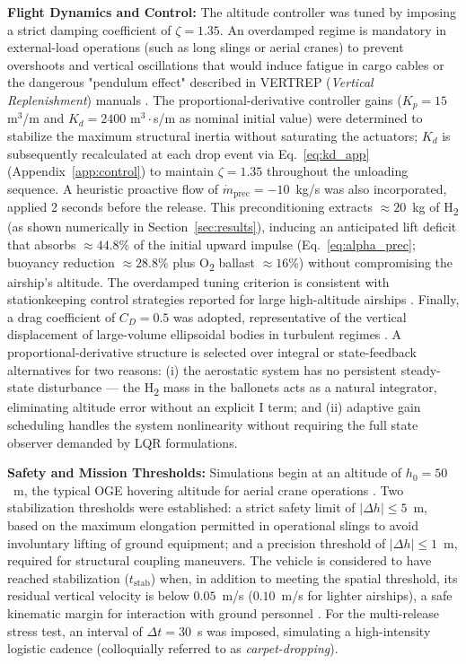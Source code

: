 \documentclass[applsci,article,submit,pdftex,moreauthors]{Definitions/mdpi}
\newcommand{\added}[1]{#1}
\begin{document}
\textbf{Flight Dynamics and Control:} The altitude controller was tuned by imposing a strict damping coefficient of $\zeta = 1.35$. An overdamped regime is mandatory in external-load operations (such as long slings or aerial cranes) to prevent overshoots and vertical oscillations that would induce fatigue in cargo cables or the dangerous "pendulum effect" described in VERTREP (\textit{Vertical Replenishment}) manuals \cite{ref7, ref8}. The proportional-derivative controller gains ($K_p = 15$ m$^3$/m and $K_d = 2400$ m$^3 \cdot$s/m as nominal initial value) were determined to stabilize the maximum structural inertia without saturating the actuators; $K_d$ is subsequently recalculated at each drop event via Eq.~\eqref{eq:kd_app} (Appendix~\ref{app:control}) to maintain $\zeta = 1.35$ throughout the unloading sequence. A heuristic proactive flow of $\dot{m}_\text{prec} = -10$~kg/s was also incorporated, applied 2 seconds before the release. This preconditioning extracts ${\approx}20$~kg of H\textsubscript{2} (as shown numerically in Section~\ref{sec:results}), inducing an anticipated lift deficit that absorbs ${\approx}44.8\%$ of the initial upward impulse (Eq.~\eqref{eq:alpha_prec}; buoyancy reduction ${\approx}28.8\%$ plus O\textsubscript{2} ballast ${\approx}16\%$) without compromising the airship's altitude. The overdamped tuning criterion is consistent with stationkeeping control strategies reported for large high-altitude airships \cite{Schmidt2007}. Finally, a drag coefficient of $C_D = 0.5$ was adopted, representative of the vertical displacement of large-volume ellipsoidal bodies in turbulent regimes \cite{ref2, Liao2009}. \added{A proportional-derivative structure is selected over integral or state-feedback alternatives for two reasons: (i) the aerostatic system has no persistent steady-state disturbance --- the H\textsubscript{2} mass in the ballonets acts as a natural integrator, eliminating altitude error without an explicit I term; and (ii) adaptive gain scheduling handles the system nonlinearity without requiring the full state observer demanded by LQR formulations.}

\textbf{Safety and Mission Thresholds:} Simulations begin at an altitude of $h_0 = 50$~m, the typical OGE hovering altitude for aerial crane operations \cite{ref7}. Two stabilization thresholds were established: a strict safety limit of $|\Delta h| \le 5$~m, based on the maximum elongation permitted in operational slings to avoid involuntary lifting of ground equipment; and a precision threshold of $|\Delta h| \le 1$~m, required for structural coupling maneuvers. The vehicle is considered to have reached stabilization ($t_\text{stab}$) when, in addition to meeting the spatial threshold, its residual vertical velocity is below $0.05$~m/s ($0.10$~m/s for lighter airships), a safe kinematic margin for interaction with ground personnel \cite{ref7}. For the multi-release stress test, an interval of $\Delta t = 30$~s was imposed, simulating a high-intensity logistic cadence (colloquially referred to as \textit{carpet-dropping}).
\end{document}
